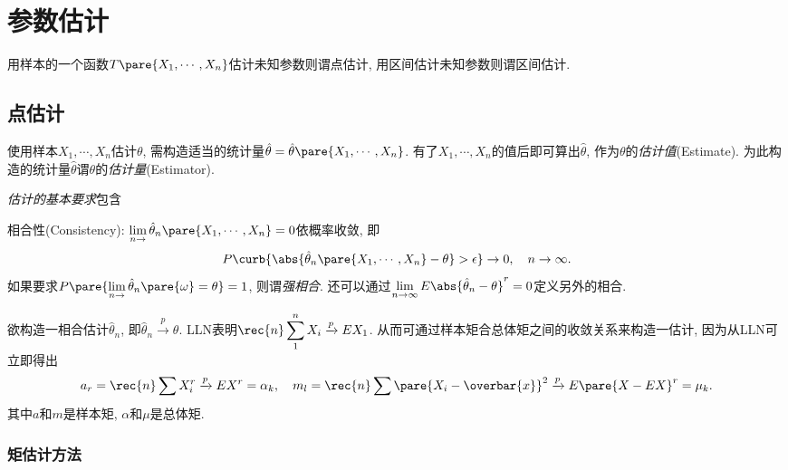 \documentclass{ctexart}
\begin{document}
\section{参数估计} %
\label{sec:参数估计}

用样本的一个函数$T\pare{X_1,\cdots,X_n}$估计未知参数则谓点估计, 用区间估计未知参数则谓区间估计.

\subsection{点估计} %
\label{sub:点估计}

使用样本$X_1,\cdots,X_n$估计$\theta$, 需构造适当的统计量$\hat\theta = \hat\theta\pare{X_1,\cdots,X_n}$. 有了$X_1,\cdots,X_n$的值后即可算出$\hat\theta$, 作为$\theta$的\emph{估计值}(Estimate). 为此构造的统计量$\hat\theta$谓$\theta$的\emph{估计量}(Estimator).
\par
\emph{估计的基本要求}包含
\begin{cenum}
    \item 相合性(Consistency): $\displaystyle \lim_{n\rightarrow}\hat\theta_n\pare{X_1,\cdots,X_n} = 0$依概率收敛, 即
    \[ P\curb{\abs{\hat\theta_n\pare{X_1,\cdots,X_n} - \theta} > \epsilon} \rightarrow 0,\quad n\rightarrow\infty. \]
    如果要求$\displaystyle P\pare{\lim_{n\rightarrow}\hat\theta_n\pare{\omega} = \theta} = 1$, 则谓\emph{强相合}. 还可以通过$\displaystyle \lim_{n\rightarrow\infty} E\abs{\hat\theta_n - \theta}^r = 0$定义另外的相合.
\end{cenum}
欲构造一相合估计$\hat\theta_n$, 即$\hat\theta_n\xrightarrow{p} \theta$. LLN表明$\displaystyle \rec{n} \sum_{1}^n X_i \xrightarrow{p} EX_1$. 从而可通过样本矩合总体矩之间的收敛关系来构造一估计, 因为从LLN可立即得出
\[ a_r = \rec{n} \sum X_i^r \xrightarrow{p} EX^r = \alpha_k,\quad m_l = \rec{n} \sum \pare{X_i - \overbar{x}}^2 \xrightarrow{p} E\pare{X - EX}^r = \mu_k. \]
其中$a$和$m$是样本矩, $\alpha$和$\mu$是总体矩.

\subsubsection{矩估计方法} %
\label{ssub:矩估计方法}
\end{document}
